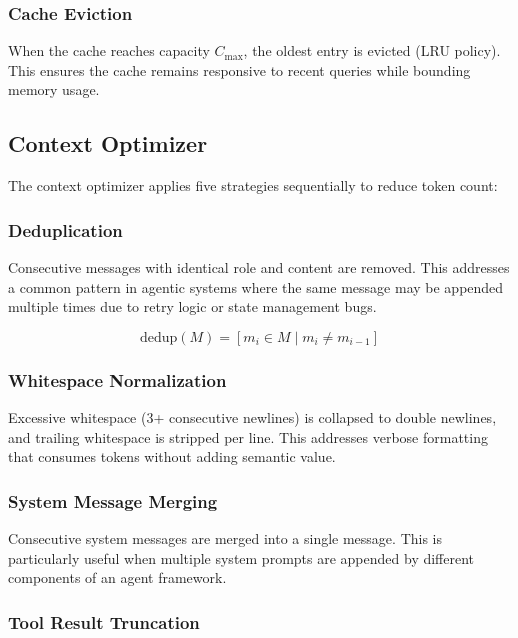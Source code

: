 \subsubsection{Cache Eviction}

When the cache reaches capacity $C_{\max}$, the oldest entry is evicted (LRU policy). This ensures the cache remains responsive to recent queries while bounding memory usage.

\subsection{Context Optimizer}

The context optimizer applies five strategies sequentially to reduce token count:

\subsubsection{Deduplication}

Consecutive messages with identical role and content are removed. This addresses a common pattern in agentic systems where the same message may be appended multiple times due to retry logic or state management bugs.

\begin{equation}
    \text{dedup}(M) = [m_i \in M \mid m_i \neq m_{i-1}]
\end{equation}

\subsubsection{Whitespace Normalization}

Excessive whitespace (3+ consecutive newlines) is collapsed to double newlines, and trailing whitespace is stripped per line. This addresses verbose formatting that consumes tokens without adding semantic value.

\subsubsection{System Message Merging}

Consecutive system messages are merged into a single message. This is particularly useful when multiple system prompts are appended by different components of an agent framework.

\subsubsection{Tool Result Truncation}

